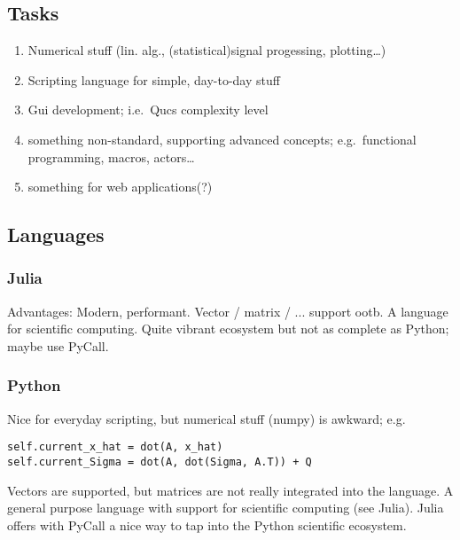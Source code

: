 
\subsection{Tasks}\label{tasks}

\begin{enumerate}
\def\labelenumi{\arabic{enumi}.}
\item
  Numerical stuff (lin. alg., (statistical)signal progessing,
  plotting\ldots{})
\item
  Scripting language for simple, day-to-day stuff
\item
  Gui development; i.e.~Qucs complexity level
\item
  something non-standard, supporting advanced concepts; e.g.~functional
  programming, macros, actors\ldots{}
\item
  something for web applications(?)
\end{enumerate}

\subsection{Languages}\label{languages}

\subsubsection{Julia}\label{julia}

Advantages: Modern, performant. Vector / matrix / ... support ootb. A language for scientific computing. Quite vibrant ecosystem but not as complete as Python; maybe use PyCall.

\subsubsection{Python}\label{python}

Nice for everyday scripting, but numerical stuff (numpy) is awkward; e.g.

\begin{verbatim}
self.current_x_hat = dot(A, x_hat)
self.current_Sigma = dot(A, dot(Sigma, A.T)) + Q
\end{verbatim}

Vectors are supported, but matrices are not really integrated into the language. A general purpose language with support for scientific computing (see Julia). Julia offers with PyCall a nice way to tap into the Python scientific ecosystem.

